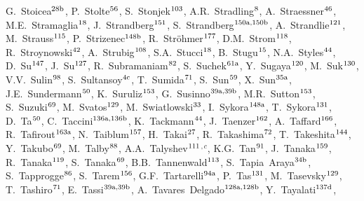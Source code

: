 \begin{flushleft}
G.~Stoicea$^\textrm{\scriptsize 28b}$,
P.~Stolte$^\textrm{\scriptsize 56}$,
S.~Stonjek$^\textrm{\scriptsize 103}$,
A.R.~Stradling$^\textrm{\scriptsize 8}$,
A.~Straessner$^\textrm{\scriptsize 46}$,
M.E.~Stramaglia$^\textrm{\scriptsize 18}$,
J.~Strandberg$^\textrm{\scriptsize 151}$,
S.~Strandberg$^\textrm{\scriptsize 150a,150b}$,
A.~Strandlie$^\textrm{\scriptsize 121}$,
M.~Strauss$^\textrm{\scriptsize 115}$,
P.~Strizenec$^\textrm{\scriptsize 148b}$,
R.~Str\"ohmer$^\textrm{\scriptsize 177}$,
D.M.~Strom$^\textrm{\scriptsize 118}$,
R.~Stroynowski$^\textrm{\scriptsize 42}$,
A.~Strubig$^\textrm{\scriptsize 108}$,
S.A.~Stucci$^\textrm{\scriptsize 18}$,
B.~Stugu$^\textrm{\scriptsize 15}$,
N.A.~Styles$^\textrm{\scriptsize 44}$,
D.~Su$^\textrm{\scriptsize 147}$,
J.~Su$^\textrm{\scriptsize 127}$,
R.~Subramaniam$^\textrm{\scriptsize 82}$,
S.~Suchek$^\textrm{\scriptsize 61a}$,
Y.~Sugaya$^\textrm{\scriptsize 120}$,
M.~Suk$^\textrm{\scriptsize 130}$,
V.V.~Sulin$^\textrm{\scriptsize 98}$,
S.~Sultansoy$^\textrm{\scriptsize 4c}$,
T.~Sumida$^\textrm{\scriptsize 71}$,
S.~Sun$^\textrm{\scriptsize 59}$,
X.~Sun$^\textrm{\scriptsize 35a}$,
J.E.~Sundermann$^\textrm{\scriptsize 50}$,
K.~Suruliz$^\textrm{\scriptsize 153}$,
G.~Susinno$^\textrm{\scriptsize 39a,39b}$,
M.R.~Sutton$^\textrm{\scriptsize 153}$,
S.~Suzuki$^\textrm{\scriptsize 69}$,
M.~Svatos$^\textrm{\scriptsize 129}$,
M.~Swiatlowski$^\textrm{\scriptsize 33}$,
I.~Sykora$^\textrm{\scriptsize 148a}$,
T.~Sykora$^\textrm{\scriptsize 131}$,
D.~Ta$^\textrm{\scriptsize 50}$,
C.~Taccini$^\textrm{\scriptsize 136a,136b}$,
K.~Tackmann$^\textrm{\scriptsize 44}$,
J.~Taenzer$^\textrm{\scriptsize 162}$,
A.~Taffard$^\textrm{\scriptsize 166}$,
R.~Tafirout$^\textrm{\scriptsize 163a}$,
N.~Taiblum$^\textrm{\scriptsize 157}$,
H.~Takai$^\textrm{\scriptsize 27}$,
R.~Takashima$^\textrm{\scriptsize 72}$,
T.~Takeshita$^\textrm{\scriptsize 144}$,
Y.~Takubo$^\textrm{\scriptsize 69}$,
M.~Talby$^\textrm{\scriptsize 88}$,
A.A.~Talyshev$^\textrm{\scriptsize 111}$$^{,c}$,
K.G.~Tan$^\textrm{\scriptsize 91}$,
J.~Tanaka$^\textrm{\scriptsize 159}$,
R.~Tanaka$^\textrm{\scriptsize 119}$,
S.~Tanaka$^\textrm{\scriptsize 69}$,
B.B.~Tannenwald$^\textrm{\scriptsize 113}$,
S.~Tapia~Araya$^\textrm{\scriptsize 34b}$,
S.~Tapprogge$^\textrm{\scriptsize 86}$,
S.~Tarem$^\textrm{\scriptsize 156}$,
G.F.~Tartarelli$^\textrm{\scriptsize 94a}$,
P.~Tas$^\textrm{\scriptsize 131}$,
M.~Tasevsky$^\textrm{\scriptsize 129}$,
T.~Tashiro$^\textrm{\scriptsize 71}$,
E.~Tassi$^\textrm{\scriptsize 39a,39b}$,
A.~Tavares~Delgado$^\textrm{\scriptsize 128a,128b}$,
Y.~Tayalati$^\textrm{\scriptsize 137d}$,
$$
\end{flushleft}
